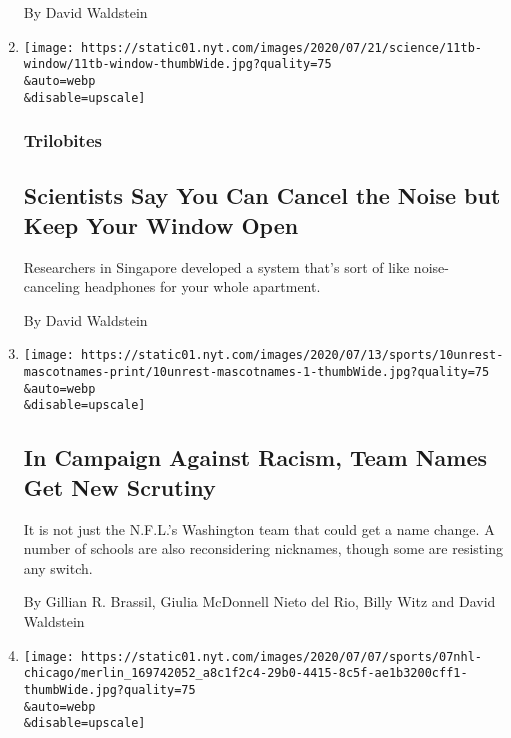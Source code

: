 \begin{enumerate}
  By David Waldstein
\item
  \href{/2020/07/11/science/windows-street-noise.html}{}

  \texttt{[image: https://static01.nyt.com/images/2020/07/21/science/11tb-window/11tb-window-thumbWide.jpg?quality=75\\\&auto=webp\\\&disable=upscale]}

  \hypertarget{trilobites-1}{%
  \subsubsection{Trilobites}\label{trilobites-1}}

  \hypertarget{scientists-say-you-can-cancel-the-noise-but-keep-your-window-open}{%
  \subsection{Scientists Say You Can Cancel the Noise but Keep Your
  Window
  Open}\label{scientists-say-you-can-cancel-the-noise-but-keep-your-window-open}}

  Researchers in Singapore developed a system that's sort of like
  noise-canceling headphones for your whole apartment.

  By David Waldstein
\item
  \href{/2020/07/10/sports/football/washington-redskins-name-change-mascots.html}{}

  \texttt{[image: https://static01.nyt.com/images/2020/07/13/sports/10unrest-mascotnames-print/10unrest-mascotnames-1-thumbWide.jpg?quality=75\\\&auto=webp\\\&disable=upscale]}

  \hypertarget{in-campaign-against-racism-team-names-get-new-scrutiny}{%
  \subsection{In Campaign Against Racism, Team Names Get New
  Scrutiny}\label{in-campaign-against-racism-team-names-get-new-scrutiny}}

  It is not just the N.F.L.'s Washington team that could get a name
  change. A number of schools are also reconsidering nicknames, though
  some are resisting any switch.

  By Gillian R. Brassil, Giulia McDonnell Nieto del Rio, Billy Witz and
  David Waldstein
\item
  \href{/2020/07/07/sports/hockey/chicago-blackhawks-stand-by-logo.html}{}

  \texttt{[image: https://static01.nyt.com/images/2020/07/07/sports/07nhl-chicago/merlin\_169742052\_a8c1f2c4-29b0-4415-8c5f-ae1b3200cff1-thumbWide.jpg?quality=75\\\&auto=webp\\\&disable=upscale]}


\end{enumerate}
